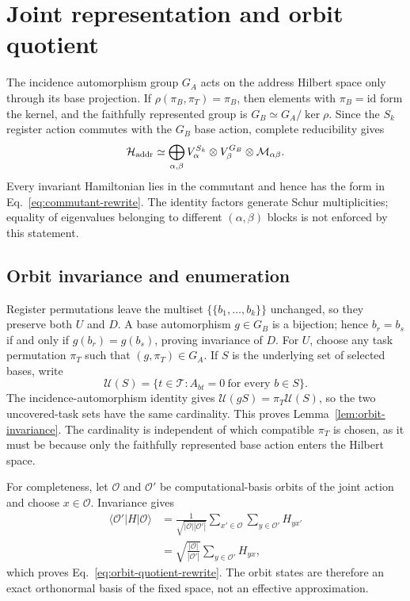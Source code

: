\section{Joint representation and orbit quotient}
\label{app:joint-representation}

The incidence automorphism group $G_A$ acts on the address Hilbert space
only through its base projection.  If
$\rho(\pi_B,\pi_T)=\pi_B$, then elements with $\pi_B=\mathrm{id}$ form the
kernel, and the faithfully represented group is
$G_B\simeq G_A/\ker\rho$.  Since the $S_k$ register action commutes with the
$G_B$ base action, complete reducibility gives
\begin{equation}
 \mathcal H_{\rm addr}\simeq
 \bigoplus_{\alpha,\beta}
 V_\alpha^{S_k}\otimes V_\beta^{G_B}\otimes
 \mathcal M_{\alpha\beta}.
 \label{eq:app-joint-decomposition}
\end{equation}
Every invariant Hamiltonian lies in the commutant and hence has the form in
Eq.~\eqref{eq:commutant-rewrite}.  The identity factors generate Schur
multiplicities; equality of eigenvalues belonging to different
$(\alpha,\beta)$ blocks is not enforced by this statement.

\subsection{Orbit invariance and enumeration}

Register permutations leave the multiset
$\{\!\{b_1,\ldots,b_k\}\!\}$ unchanged, so they preserve both $U$ and
$D$.  A base automorphism $g\in G_B$ is a bijection; hence
$b_r=b_s$ if and only if $g(b_r)=g(b_s)$, proving invariance of $D$.
For $U$, choose any task permutation $\pi_T$ such that
$(g,\pi_T)\in G_A$.  If $S$ is the underlying set of selected bases, write
\begin{equation}
 \mathcal U(S)=\{t\in\mathcal T:A_{bt}=0\ \text{for every }b\in S\}.
\end{equation}
The incidence-automorphism identity gives
$\mathcal U(gS)=\pi_T\mathcal U(S)$, so the two uncovered-task sets have
the same cardinality.  This proves Lemma~\ref{lem:orbit-invariance}.  The
cardinality is independent of which compatible $\pi_T$ is chosen, as it
must be because only the faithfully represented base action enters the
Hilbert space.

For completeness, let $\mathcal O$ and $\mathcal O'$ be computational-basis
orbits of the joint action and choose $x\in\mathcal O$.  Invariance gives
\begin{align}
 \langle\mathcal O'|H|\mathcal O\rangle
 &=\frac{1}{\sqrt{|\mathcal O||\mathcal O'|}}
 \sum_{x'\in\mathcal O}\sum_{y\in\mathcal O'}H_{yx'}\\
 &=\sqrt{\frac{|\mathcal O|}{|\mathcal O'|}}
 \sum_{y\in\mathcal O'}H_{yx},
\end{align}
which proves Eq.~\eqref{eq:orbit-quotient-rewrite}.  The orbit states are
therefore an exact orthonormal basis of the fixed space, not an effective
approximation.

